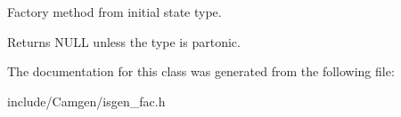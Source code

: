 Factory method from initial state type. 

Returns N\+U\+L\+L unless the type is partonic. 

The documentation for this class was generated from the following file\+:\begin{DoxyCompactItemize}
\item 
include/\+Camgen/isgen\+\_\+fac.\+h\end{DoxyCompactItemize}
